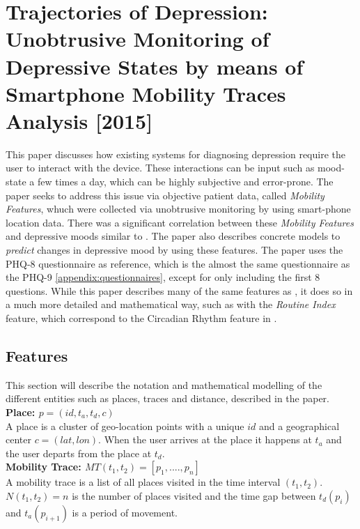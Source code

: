 \section{Trajectories of Depression: Unobtrusive Monitoring of Depressive States by means of Smartphone Mobility Traces Analysis [2015]} 
\cite{Canzian2015}
This paper discusses how existing systems for diagnosing depression require the user to interact with the device. These interactions can be input such as mood-state a few times a day, which can be highly subjective and error-prone. The paper seeks to address this issue via objective patient data, called \textit{Mobility Features}, whuch were collected via unobtrusive monitoring by using smart-phone location data. There was a significant correlation between these \textit{Mobility Features} and depressive moods similar to \cite{Saeb2015}. The paper also describes concrete models to \textit{predict} changes in depressive mood by using these features. The paper uses the PHQ-8 questionnaire as reference, which is the almost the same questionnaire as the PHQ-9 \ref{appendix:questionnaires}, except for only including the first 8 questions. While this paper describes many of the same features as \cite{Saeb2015}, it does so in a much more detailed and mathematical way, such as with the \textit{Routine Index} feature, which correspond to the Circadian Rhythm feature in \cite{Saeb2015}.

\subsection{Features}
This section will describe the notation and mathematical modelling of the different entities such as places, traces and distance, described in the paper.\\

\textbf{Place: $p = (id, t_a, t_d, c)$}\\
A place is a cluster of geo-location points with a unique $id$ and a geographical center $c = (lat, lon)$. When the user arrives at the place it happens at $t_a$ and the user departs from the place at $t_d$. \\

\textbf{Mobility Trace: $MT(t_1, t_2) = [p_1, ...., p_n]$}\\
A mobility trace is a list of all places visited in the time interval $(t_1, t_2)$. $N(t_1, t_2) = n$ is the number of places visited and the time gap between $t_d (p_i)$ and $t_a (p_{i+1})$ is a period of movement.\\

